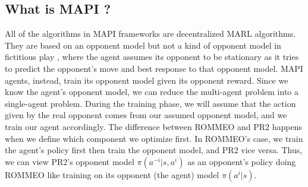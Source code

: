 \label{sec:chap3-intro-MAPI}

\subsection{What is MAPI ?}
All of the algorithms in MAPI frameworks are decentralized MARL algorithms. They are based on an opponent model but not a kind of opponent model in fictitious play \cite{berger2007brown}, where the agent assumes its opponent to be stationary as it tries to predict the opponent's move and best response to that opponent model. MAPI agents, instead, train its opponent model given its opponent reward. Since we know the agent's opponent model, we can reduce the multi-agent problem into a single-agent problem. During the training phase, we will assume that the action given by the real opponent comes from our assumed opponent model, and we train our agent accordingly. The difference between ROMMEO \cite{tian2019regularized} and PR2 \cite{wen2019probabilistic} happens when we define which component we optimize first. In ROMMEO's case, we train the agent's policy first then train the opponent model, and PR2 vice versa. Thus, we can view PR2's opponent model $\pi(a^{-i} | s, a^i)$ as an opponent's policy doing ROMMEO like training on its opponent (the agent) model $\pi(a^i | s)$. 

